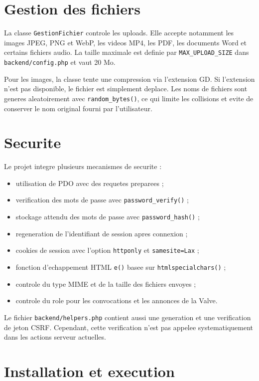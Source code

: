 \documentclass[12pt,a4paper]{article}
\begin{document}
\section{Gestion des fichiers}

La classe \texttt{GestionFichier} controle les uploads. Elle accepte notamment les images JPEG, PNG et WebP, les videos MP4, les PDF, les documents Word et certains fichiers audio. La taille maximale est definie par \texttt{MAX\_UPLOAD\_SIZE} dans \texttt{backend/config.php} et vaut 20 Mo.

Pour les images, la classe tente une compression via l'extension GD. Si l'extension n'est pas disponible, le fichier est simplement deplace. Les noms de fichiers sont generes aleatoirement avec \texttt{random\_bytes()}, ce qui limite les collisions et evite de conserver le nom original fourni par l'utilisateur.

\section{Securite}

Le projet integre plusieurs mecanismes de securite :

\begin{itemize}
    \item utilisation de PDO avec des requetes preparees ;
    \item verification des mots de passe avec \texttt{password\_verify()} ;
    \item stockage attendu des mots de passe avec \texttt{password\_hash()} ;
    \item regeneration de l'identifiant de session apres connexion ;
    \item cookies de session avec l'option \texttt{httponly} et \texttt{samesite=Lax} ;
    \item fonction d'echappement HTML \texttt{e()} basee sur \texttt{htmlspecialchars()} ;
    \item controle du type MIME et de la taille des fichiers envoyes ;
    \item controle du role pour les convocations et les annonces de la Valve.
\end{itemize}

Le fichier \texttt{backend/helpers.php} contient aussi une generation et une verification de jeton CSRF. Cependant, cette verification n'est pas appelee systematiquement dans les actions serveur actuelles.

\section{Installation et execution}
\end{document}
